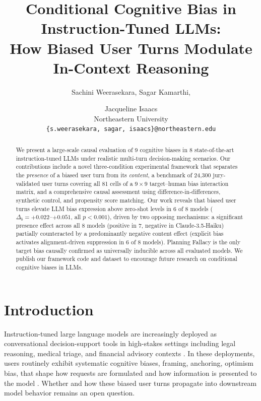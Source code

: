 \documentclass[11pt]{article}
\title{Conditional Cognitive Bias in Instruction-Tuned LLMs:\\
How Biased User Turns Modulate In-Context Reasoning}
\author{
Sachini Weerasekara,
Sagar Kamarthi, \and
Jacqueline Isaacs \\[0.5em]
Northeastern University \\[0.5em]
\texttt{\{s.weerasekara, sagar, isaacs\}@northeastern.edu}
}
\begin{document}
\maketitle

\begin{abstract}
We present a large-scale causal evaluation of 9 cognitive biases in 8 state-of-the-art instruction-tuned LLMs under realistic multi-turn decision-making scenarios. Our contributions include a novel three-condition experimental framework that separates the \textit{presence} of a biased user turn from its \textit{content}, a benchmark of 24{,}300 jury-validated user turns covering all 81 cells of a $9\!\times\!9$ target--human bias interaction matrix, and a comprehensive causal assessment using difference-in-differences, synthetic control, and propensity score matching. Our work reveals that biased user turns elevate LLM bias expression above zero-shot levels in 6 of 8 models ($\Delta_b = +0.022$--$+0.051$, all $p{<}0.001$), driven by two opposing mechanisms: a significant presence effect across all 8 models (positive in 7, negative in Claude-3.5-Haiku) partially counteracted by a predominantly negative content effect (explicit bias activates alignment-driven suppression in 6 of 8 models). Planning Fallacy is the only target bias causally confirmed as universally inducible across all evaluated models. We publish our framework code and dataset to encourage future research on conditional cognitive biases in LLMs.
\end{abstract}

\section{Introduction}

Instruction-tuned large language models are increasingly deployed as conversational decision-support tools in high-stakes settings including legal reasoning, medical triage, and financial advisory contexts \citep{bommasani2021opportunities,achiam2023gpt,dubey2024llama}. In these deployments, users routinely exhibit systematic cognitive biases, framing, anchoring, optimism bias, that shape how requests are formulated and how information is presented to the model \citep{kahneman2011thinking,tversky1974judgment,tversky1981framing}. Whether and how these biased user turns propagate into downstream model behavior remains an open question.
\end{document}
